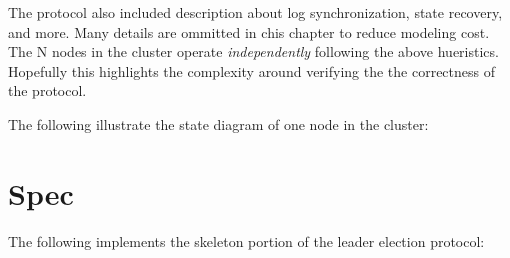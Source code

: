 The protocol also included description about log synchronization, state
recovery, and more. Many details are ommitted in chis chapter to reduce modeling
cost. The N nodes in the cluster operate \textit{independently} following the
above hueristics. Hopefully this highlights the complexity around verifying the
the correctness of the protocol.\newline

The following illustrate the state diagram of one node in the cluster:\newline
\begin{center}
\end{center}

\section{Spec}

The following implements the skeleton portion of the leader election
protocol:\newline

